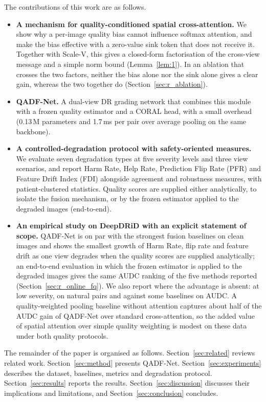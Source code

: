 \documentclass[final,5p,times,twocolumn,authoryear]{elsarticle}
\newcommand{\qadfnet}{QADF-Net}
\theoremstyle{plain}
\theoremstyle{remark}
\begin{document}
The contributions of this work are as follows.  
\begin{itemize}
  \item \textbf{A mechanism for quality-conditioned spatial cross-attention.} We show why a per-image quality bias cannot influence softmax attention, and make the bias effective with a zero-value sink token that does not receive it. Together with Scale-V, this gives a closed-form factorisation of the cross-view message and a simple norm bound (Lemma~\ref{lem:1}). In an ablation that crosses the two factors, neither the bias alone nor the sink alone gives a clear gain, whereas the two together do (Section~\ref{sec:r_ablation}).
  \item \textbf{QADF-Net.} A dual-view DR grading network that combines this module with a frozen quality estimator and a CORAL head, with a small overhead (0.13\,M parameters and 1.7\,ms per pair over average pooling on the same backbone).
  \item \textbf{A controlled-degradation protocol with safety-oriented measures.} We evaluate seven degradation types at five severity levels and three view scenarios, and report Harm Rate, Help Rate, Prediction Flip Rate (PFR) and Feature Drift Index (FDI) alongside agreement and robustness measures, with patient-clustered statistics. Quality scores are supplied either analytically, to isolate the fusion mechanism, or by the frozen estimator applied to the degraded images (end-to-end).
  \item \textbf{An empirical study on DeepDRiD with an explicit statement of scope.} QADF-Net is on par with the strongest fusion baselines on clean images and shows the smallest growth of Harm Rate, flip rate and feature drift as one view degrades when the quality scores are supplied analytically; an end-to-end evaluation in which the frozen estimator is applied to the degraded images gives the same AUDC ranking of the five methods reported (Section~\ref{sec:r_online_fq}). We also report where the advantage is absent: at low severity, on natural pairs and against some baselines on AUDC. A quality-weighted pooling baseline without attention captures about half of the AUDC gain of \qadfnet{} over standard cross-attention, so the added value of spatial attention over simple quality weighting is modest on these data under both quality protocols.
\end{itemize}

The remainder of the paper is organised as follows. Section~\ref{sec:related} reviews related work. Section~\ref{sec:method} presents QADF-Net. Section~\ref{sec:experiments} describes the dataset, baselines, metrics and degradation protocol. Section~\ref{sec:results} reports the results. Section~\ref{sec:discussion} discusses their implications and limitations, and Section~\ref{sec:conclusion} concludes.
\end{document}
